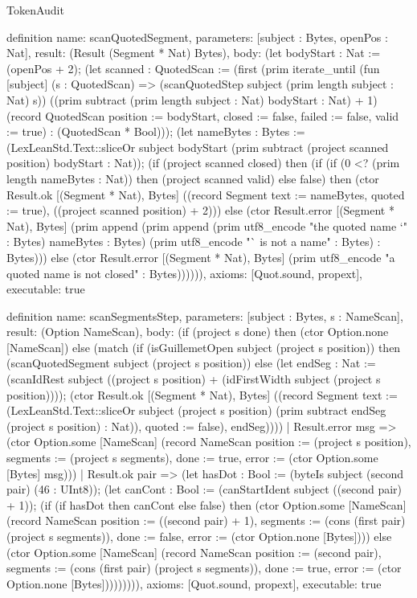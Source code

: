 \begin{lexlean}{TokenAudit}
\begin{semanticmodule}
definition{
  name: scanQuotedSegment,
  parameters: [subject : Bytes, openPos : Nat],
  result: (Result (Segment * Nat) Bytes),
  body: (let bodyStart : Nat := (openPos + 2); (let scanned : QuotedScan := (first (prim iterate_until (fun [subject] (s : QuotedScan) => (scanQuotedStep subject (prim length subject : Nat) s)) ((prim subtract (prim length subject : Nat) bodyStart : Nat) + 1) (record QuotedScan {position := bodyStart, closed := false, failed := false, valid := true}) : (QuotedScan * Bool))); (let nameBytes : Bytes := (LexLeanStd.Text::sliceOr subject bodyStart (prim subtract (project scanned position) bodyStart : Nat)); (if (project scanned closed) then (if (if (0 <? (prim length nameBytes : Nat)) then (project scanned valid) else false) then (ctor Result.ok [(Segment * Nat), Bytes] ((record Segment {text := nameBytes, quoted := true}), ((project scanned position) + 2))) else (ctor Result.error [(Segment * Nat), Bytes] (prim append (prim append (prim utf8_encode "the quoted name `" : Bytes) nameBytes : Bytes) (prim utf8_encode "` is not a name" : Bytes) : Bytes))) else (ctor Result.error [(Segment * Nat), Bytes] (prim utf8_encode "a quoted name is not closed" : Bytes)))))),
  axioms: [Quot.sound, propext],
  executable: true
}

definition{
  name: scanSegmentsStep,
  parameters: [subject : Bytes, s : NameScan],
  result: (Option NameScan),
  body: (if (project s done) then (ctor Option.none [NameScan]) else (match (if (isGuillemetOpen subject (project s position)) then (scanQuotedSegment subject (project s position)) else (let endSeg : Nat := (scanIdRest subject ((project s position) + (idFirstWidth subject (project s position)))); (ctor Result.ok [(Segment * Nat), Bytes] ((record Segment {text := (LexLeanStd.Text::sliceOr subject (project s position) (prim subtract endSeg (project s position) : Nat)), quoted := false}), endSeg))))
    | Result.error msg => (ctor Option.some [NameScan] (record NameScan {position := (project s position), segments := (project s segments), done := true, error := (ctor Option.some [Bytes] msg)}))
    | Result.ok pair => (let hasDot : Bool := (byteIs subject (second pair) (46 : UInt8)); (let canCont : Bool := (canStartIdent subject ((second pair) + 1)); (if (if hasDot then canCont else false) then (ctor Option.some [NameScan] (record NameScan {position := ((second pair) + 1), segments := (cons (first pair) (project s segments)), done := false, error := (ctor Option.none [Bytes])})) else (ctor Option.some [NameScan] (record NameScan {position := (second pair), segments := (cons (first pair) (project s segments)), done := true, error := (ctor Option.none [Bytes])}))))))),
  axioms: [Quot.sound, propext],
  executable: true
}


\end{semanticmodule}
\end{lexlean}
